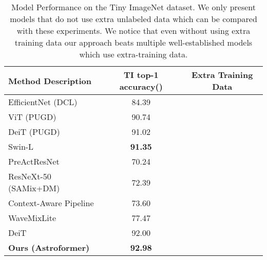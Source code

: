 \documentclass{article} \usepackage{iclr2023_conference,times}
\newcommand{\cmark}{\ding{51}}\newcommand{\xmark}{\ding{55}}
\begin{document}
\begin{table}[ht]
    \caption{Model Performance on the Tiny ImageNet dataset. We only present models that do not use extra unlabeled data which can be compared with these experiments. We notice that even without using extra training data our approach beats multiple well-established models which use extra-training data.}
    \centering
    \begin{tabular}{lcc}
        \toprule
        \textbf{Method Description} & \textbf{TI top-1 accuracy()} & \textbf{Extra Training Data}\\
        \midrule
        EfficientNet (DCL) \citep{luo2019direction} & 84.39 & \cmark\\
        ViT (PUGD) \citep{tseng2022perturbed} & 90.74 & \cmark\\
        DeiT (PUGD) \citep{tseng2022perturbed} & 91.02 & \cmark\\
        Swin-L \citep{huynh2022vision} & \textbf{91.35} & \cmark\\
        \midrule
        PreActResNet \citep{rame2021mixmo} & 70.24 & \xmark\\
        ResNeXt-50 (SAMix+DM) \citep{https://doi.org/10.48550/arxiv.2203.10761} & 72.39 & \xmark\\
        Context-Aware Pipeline \citep{yao2021context} & 73.60 & \xmark\\
        WaveMixLite \citep{viswanathanwavemix} & 77.47 & \xmark\\
        DeiT \citep{https://doi.org/10.48550/arxiv.2210.00471} & 92.00 & \xmark\\
        \textbf{Ours (Astroformer)} & \textbf{92.98} & \xmark\\
        \bottomrule
    \end{tabular}
    \label{tab:tiresults}
\end{table}
\end{document}
